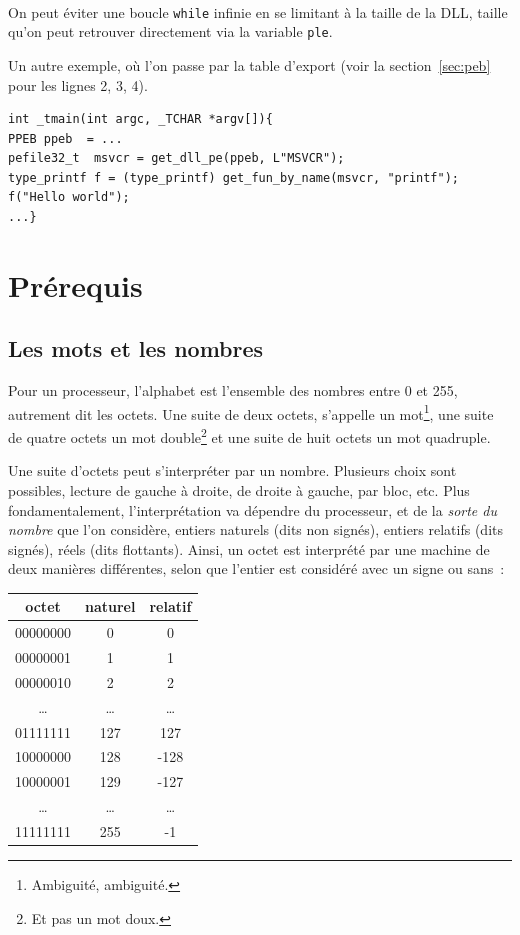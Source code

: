 \documentclass{book}
\newenvironment{commentaire}[1]{%
	\def\FrameCommand{\fboxrule=\FrameRule\fboxsep=\FrameSep \fcolorbox{yellow!50}{yellow!10}}%
	\MakeFramed {\advance\hsize-\width \FrameRestore}
	\noindent {\bf #1}\\
}%
{\endMakeFramed}
\newcommand{\code}[1]{\texttt{#1}}
\begin{document}
\begin{commentaire}{Pour faire mieux}
	On peut éviter une boucle \code{while} infinie en se limitant à la taille de la DLL, taille qu'on peut retrouver directement via la variable \code{ple}. 
\end{commentaire}

Un autre exemple, où l'on passe par la table d'export (voir la section~\ref{sec:peb} pour les lignes 2, 3, 4). 

\begin{verbatim}
int _tmain(int argc, _TCHAR *argv[]){
PPEB ppeb  = ...
pefile32_t  msvcr = get_dll_pe(ppeb, L"MSVCR");
type_printf f = (type_printf) get_fun_by_name(msvcr, "printf");
f("Hello world");
...}
\end{verbatim}





	

\chapter{Prérequis}

\section{Les mots et les nombres}

Pour un processeur, l'alphabet est l'ensemble des nombres entre 0 et 255, autrement dit les octets.
Une suite de deux octets, s'appelle un mot\footnote{Ambiguité, ambiguité.}, une suite de quatre octets un mot double\footnote{Et pas un mot doux.} et une suite de huit octets un mot quadruple.

Une suite d'octets peut s'interpréter par un nombre. Plusieurs choix sont possibles, lecture de gauche à droite, de droite à gauche, par bloc, etc. Plus fondamentalement, l'interprétation va dépendre du processeur, et de la \emph{sorte du nombre} que l'on considère, entiers naturels (dits non signés), entiers relatifs (dits signés), réels (dits flottants).  Ainsi, un octet est interprété par une machine de deux manières différentes, selon que l'entier est considéré avec un signe ou sans~: 

\begin{center}
	\begin{tabular}{| c | c | c |}
		\hline
		octet & naturel & relatif\\
		\hline
		00000000 & 0 & 0\\
		\hline 00000001 & 1 & 1\\
		\hline 00000010 & 2 & 2\\
		\hline \ldots & \ldots & \ldots\\
		\hline 01111111 & 127 & 127\\
		\hline 10000000 & 128 & -128\\
		\hline 10000001 & 129 & -127\\
		\hline \ldots& \ldots & \ldots\\
		\hline 11111111 & 255 & -1\\
		\hline
	\end{tabular}
\end{center}
\end{document}
